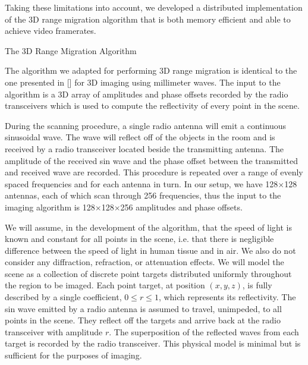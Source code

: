 \documentclass[twocolumn]{article}
\makeatletter
\def\section{\@startsection{section}{1}{\z@}{24pt plus 2 pt
minus 2 pt} {12pt plus 2pt minus 2pt}{\large\bf}}
\makeatother
\begin{document}
Taking these limitations into account, we developed a distributed implementation of the 3D range migration algorithm that is both memory efficient and able to achieve video framerates.

\section{The 3D Range Migration Algorithm}
\label{algorithm-section}

The algorithm we adapted for performing 3D range migration is identical to the one presented in [] for 3D imaging using millimeter waves. The input to the algorithm is a 3D array of amplitudes and phase offsets recorded by the radio transceivers which is used to compute the reflectivity of every point in the scene. 

During the scanning procedure, a single radio antenna will emit a continuous sinusoidal wave. The wave will reflect off of the objects in the room and is received by a radio transceiver located beside the transmitting antenna. The amplitude of the received sin wave and the phase offset between the transmitted and received wave are recorded. This procedure is repeated over a range of evenly spaced frequencies and for each antenna in turn. In our setup, we have 128$\times$128 antennas, each of which scan through 256 frequencies, thus the input to the imaging algorithm is 128$\times$128$\times$256 amplitudes and phase offsets.

We will assume, in the development of the algorithm, that the speed of light is known and constant for all points in the scene, i.e. that there is negligible difference between the speed of light in human tissue and in air. We also do not consider any diffraction, refraction, or attenuation effects. We will model the scene as a collection of discrete point targets distributed uniformly throughout the region to be imaged. Each point target, at position $(x,y,z)$, is fully described by a single coefficient, $0 \leq r \leq 1$, which represents its reflectivity. The sin wave emitted by a radio antenna is assumed to travel, unimpeded, to all points in the scene. They reflect off the targets and arrive back at the radio transceiver with amplitude $r$. The superposition of the reflected waves from each target is recorded by the radio transceiver. This physical model is minimal but is sufficient for the purposes of imaging.
\end{document}
